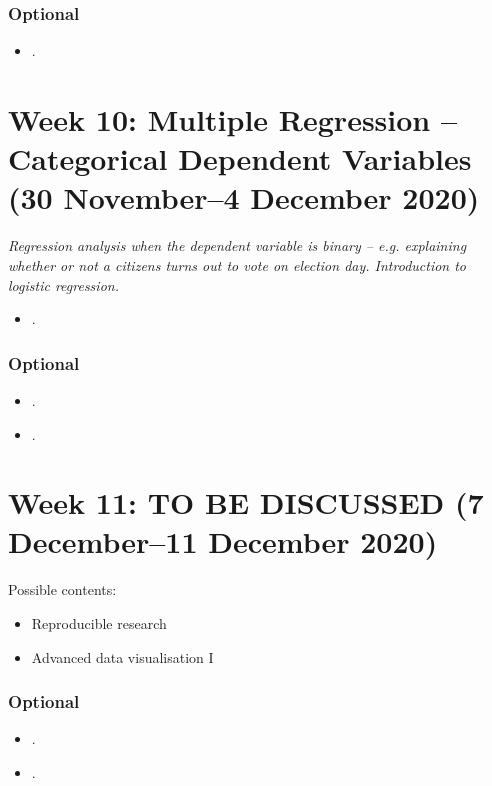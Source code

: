 \documentclass[abstract=on,parskip=full,headings=standardclasses,fontsize=11pt,paper=a4]{scrartcl}
\begin{document}
\subsubsection*{Optional}
\begin{itemize}
\item {}.
\end{itemize}


\section{Week 10: Multiple Regression --  Categorical Dependent Variables (30 November--4 December 2020)}


\textit{Regression analysis when the dependent variable is binary -- e.g. explaining whether or not a citizens turns out to vote on election day. Introduction to logistic regression.}

\begin{itemize}
\item {}.
\end{itemize}

\subsubsection*{Optional}
\begin{itemize}
\item {}.
\item {}.
\end{itemize}
 
\section{Week 11: TO BE DISCUSSED  (7 December--11 December 2020)}


Possible contents: 

\begin{itemize}
\item Reproducible research
\item Advanced data visualisation I
\end{itemize}


\subsubsection*{Optional}
\begin{itemize}
\item {}.
\item {}.
\end{itemize}
\end{document}
